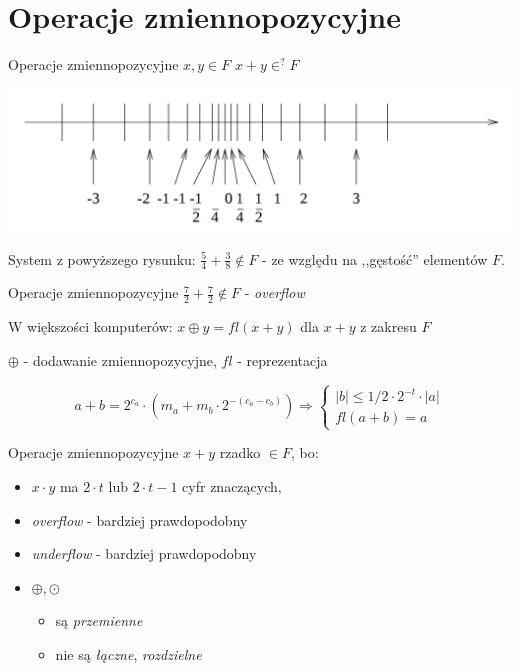 \section{Operacje zmiennopozycyjne}
\begin{frame}{Operacje zmiennopozycyjne}
    $x, y \in F$ \newline
    $x + y \in^? F$

    \begin{center}
    \includegraphics[width=0.8\linewidth]{img/2/2_1_axis}
    \end{center}
    System z powyższego rysunku: $\frac{5}{4} + \frac{3}{8} \notin F$ - ze względu na ,,gęstość'' elementów $F$.
\end{frame}
\begin{frame}{Operacje zmiennopozycyjne}
    $\frac{7}{2} + \frac{7}{2} \notin F$ - {\it overflow}
    \vspace{.5cm}

    W większości komputerów: $x \oplus y = fl(x + y)$ dla $x + y$ z zakresu $F$

    $\oplus$ - dodawanie zmiennopozycyjne, \newline
    $fl$ - reprezentacja

    \[
    a + b = 2^{c_a} \cdot \left( m_a + m_b \cdot 2^{-(c_a-c_b)} \right) \Rightarrow
    \left\{ 
        \begin{array}{ll}
            |b| \le 1/2 \cdot 2^{-t} \cdot |a| \\
            fl(a + b) = a
        \end{array}
    \right.
    \]
\end{frame}
\begin{frame}{Operacje zmiennopozycyjne}
    $x + y$ rzadko $\in F$, bo:
    \begin{itemize}
    \item $x \cdot y$ ma $2 \cdot t$ lub $2 \cdot t - 1$ cyfr znaczących,
    \item {\it overflow} - bardziej prawdopodobny
    \item {\it underflow} - bardziej prawdopodobny
    \item $\oplus, \odot$
        \begin{itemize}
        \item są {\it przemienne}
        \item nie są {\it łączne}, {\it rozdzielne}
        \end{itemize}
    \end{itemize}
\end{frame}
